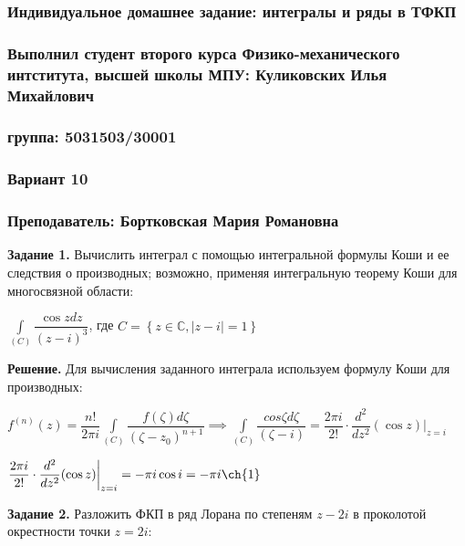 \documentclass[a4paper, 12pt]{article}
\begin{document}
	\begin{center}
		\subsubsection*{Индивидуальное домашнее задание: интегралы и ряды в ТФКП}
		\subsubsection*{Выполнил студент второго курса Физико-механического интститута, высшей школы МПУ: Куликовских Илья Михайлович}
		\subsubsection*{группа: 5031503/30001}
		\subsubsection*{Вариант 10}
		\subsubsection*{Преподаватель: Бортковская Мария Романовна}
	\end{center}


	\quad \textbf{Задание 1.}  Вычислить интеграл с помощью интегральной формулы Коши и ее следствия о производных; возможно, применяя интегральную теорему Коши для многосвязной области: 
	
	\begin{center}
		$ \displaystyle \int\limits_{(C)} \dfrac{\cos{z} dz}{(z-i)^3} $, где $C = \left\{ z \in\mathbb C,  |z - i| =1 \right\}$
	\end{center}
	
	\quad \textbf{Решение.} Для вычисления заданного интеграла используем формулу Коши для производных: 
	
	\begin{center}
		$f^{(n)}(z) = \dfrac{n!}{2 \pi i} \displaystyle \int\limits_{(C)} \dfrac{f(\zeta) d\zeta}{(\zeta - z_0)^{n+1}} \implies \displaystyle\int\limits_{(C)} \dfrac{cos\zeta d\zeta}{(\zeta - i)} = \dfrac{2\pi i}{2!} \cdot \dfrac{d^2}{dz^2} (\cos z) \bigg|_{z=i} $
		
		$ \dfrac{2 \pi i}{2!} \cdot \dfrac{d^2}{dz^2} (\cos z)\bigg|_{z=i} =  -\pi i \cos{i} = -\pi i \ch{1}$
	\end{center}
	
	\quad \textbf{Задание 2.} Разложить ФКП в ряд Лорана по степеням $z-2i$ в проколотой окрестности точки $z=2i$:
	
\end{document}
